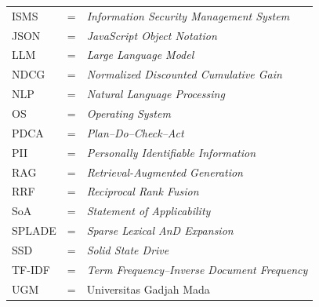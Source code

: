 \begin{tabular}{llp{9.8cm}}
	ISMS      & \hspace{0.8cm} = & \textit{Information Security Management System} \\[1pt]
	JSON      & \hspace{0.8cm} = & \textit{JavaScript Object Notation} \\[1pt]
	LLM       & \hspace{0.8cm} = & \textit{Large Language Model} \\[1pt]
	NDCG      & \hspace{0.8cm} = & \textit{Normalized Discounted Cumulative Gain} \\[1pt]
	NLP       & \hspace{0.8cm} = & \textit{Natural Language Processing} \\[1pt]
	OS        & \hspace{0.8cm} = & \textit{Operating System} \\[1pt]
	PDCA      & \hspace{0.8cm} = & \textit{Plan--Do--Check--Act} \\[1pt]
	PII       & \hspace{0.8cm} = & \textit{Personally Identifiable Information} \\[1pt]
	RAG       & \hspace{0.8cm} = & \textit{Retrieval-Augmented Generation} \\[1pt]
	RRF       & \hspace{0.8cm} = & \textit{Reciprocal Rank Fusion} \\[1pt]
	SoA       & \hspace{0.8cm} = & \textit{Statement of Applicability} \\[1pt]
	SPLADE    & \hspace{0.8cm} = & \textit{Sparse Lexical AnD Expansion} \\[1pt]
	SSD       & \hspace{0.8cm} = & \textit{Solid State Drive} \\[1pt]
	TF-IDF    & \hspace{0.8cm} = & \textit{Term Frequency--Inverse Document Frequency} \\[1pt]
	UGM       & \hspace{0.8cm} = & Universitas Gadjah Mada \\
\end{tabular}
